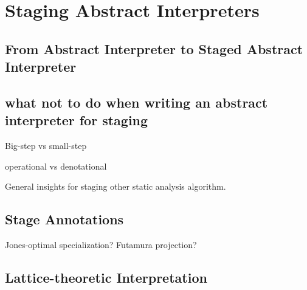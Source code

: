 \section{Staging Abstract Interpreters}

\subsection{From Abstract Interpreter to Staged Abstract Interpreter}

\subsection{what not to do when writing an abstract interpreter for staging}

Big-step vs small-step

operational vs denotational

General insights for staging other static analysis algorithm.

\cite{10.1007/3-540-61580-6_11}

\subsection{Stage Annotations}

Jones-optimal specialization?
Futamura projection?

\subsection{Lattice-theoretic Interpretation}
